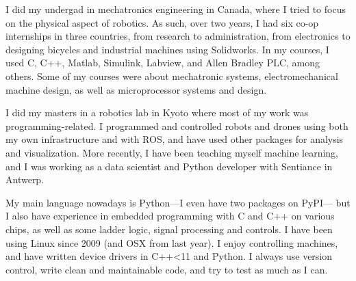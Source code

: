I did my undergad in mechatronics engineering in Canada, where I tried to focus on the physical aspect of robotics.
As such, over two years, I had six co-op internships in three countries, from research to administration, from electronics to designing bicycles and industrial machines using Solidworks.
In my courses, I used C, C++, Matlab, Simulink, Labview, and Allen Bradley PLC, among others. Some of my courses were about mechatronic systems, electromechanical machine design, as well as microprocessor systems and design.

I did my masters in a robotics lab in Kyoto where most of my work was programming-related.
I programmed and controlled robots and drones using both my own infrastructure and with ROS, and have used other packages for analysis and visualization.
More recently, I have been teaching myself machine learning, and I was working as a data scientist and Python developer with Sentiance in Antwerp.

My main language nowadays is Python---I even have two packages on PyPI--- but I also have experience in embedded programming with C and C++ on various chips, as well as some ladder logic, signal processing and controls.
I have been using Linux since 2009 (and OSX from last year).
I enjoy controlling machines, and have written device drivers in C++<11 and Python.
I always use version control, write clean and maintainable code, and try to test as much as I can.
